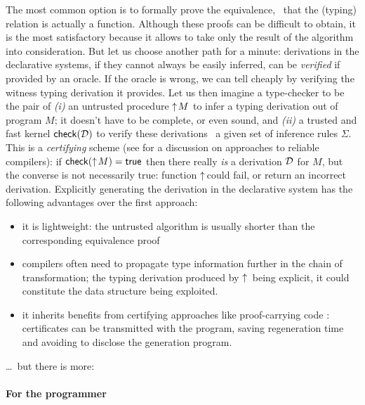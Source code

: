 \documentclass{llncs}
\begin{document}
The most common option is to formally prove the equivalence, \ie\ that
the (typing) relation is actually a function. Although these proofs
can be difficult to obtain, it is the most satisfactory because it
allows to take only the result of the algorithm into
consideration. But let us choose another path for a minute:
derivations in the declarative systems, if they cannot always be
easily inferred, can be \emph{verified} if provided by an oracle. If
the oracle is wrong, we can tell cheaply by verifying the witness
typing derivation it provides. Let us then imagine a type-checker to
be the pair of \emph{(i)} an untrusted procedure $\uparrow\!{M}$ to infer
a typing derivation out of program $M$; it doesn't have to be
complete, or even sound, and \emph{(ii)} a trusted and fast kernel
${\text{\textsf{check}}}({\mathcal D})$ to verify these derivations \wrt\ a given set of
inference rules $\Sigma$. This is a \emph{certifying} scheme (see
\cite{leroy2006compcert} for a discussion on approaches to reliable
compilers): if ${\text{\textsf{check}}}({\uparrow\!{M}}) = \text{\textsf{true}}$ then there really
\emph{is} a derivation $\mathcal D$ for $M$, but the converse is not
necessarily true: function $\uparrow\!{}\!\!$ could fail, or return an
incorrect derivation. Explicitly generating the derivation in the
declarative system has the following advantages over the first
approach:
\begin{itemize}
\item it is lightweight: the untrusted algorithm is usually shorter
  than the corresponding equivalence proof
\item compilers often need to propagate type information further in
  the chain of transformation; the typing derivation produced by
  $\uparrow\!{}$ being explicit, it could constitute the data structure
  being exploited.
\item it inherits benefits from certifying approaches like
  proof-carrying code \cite{necula1997proof}: certificates can be
  transmitted with the program, saving regeneration time and avoiding
  to disclose the generation program.
\end{itemize}
\ldots\ but there is more:

\paragraph{For the programmer}
\end{document}
